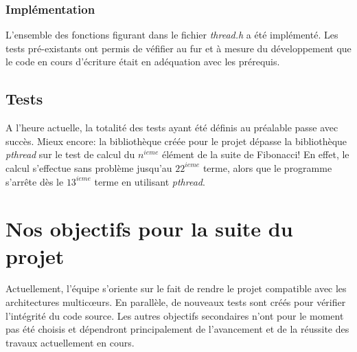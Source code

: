 \documentclass[a4paper,11pt]{article}
\begin{document}
\subsubsection{Implémentation}

L'ensemble des fonctions figurant dans le fichier \textit{thread.h} a été implémenté. Les tests pré-existants ont permis de véfifier au fur et à mesure du développement que le code en cours d'écriture était en adéquation avec les prérequis.

\subsection{Tests}

A l'heure actuelle, la totalité des tests ayant été définis au préalable passe avec succès. Mieux encore: la bibliothèque créée pour le projet dépasse la bibliothèque \textit{pthread} sur le test de calcul du $n^{ieme}$ élément de la suite de Fibonacci! En effet, le calcul s'effectue sans problème jusqu'au $22^{ieme}$ terme, alors que le programme s'arrête dès le $13^{ieme}$ terme en utilisant \textit{pthread}.

\section{Nos objectifs pour la suite du projet}

Actuellement, l'équipe s'oriente sur le fait de rendre le projet compatible avec les architectures multic\oe urs. En parallèle, de nouveaux tests sont créés pour vérifier l'intégrité du code source. Les autres objectifs secondaires n'ont pour le moment pas été choisis et dépendront principalement de l'avancement et de la réussite des travaux actuellement en cours.
\end{document}
